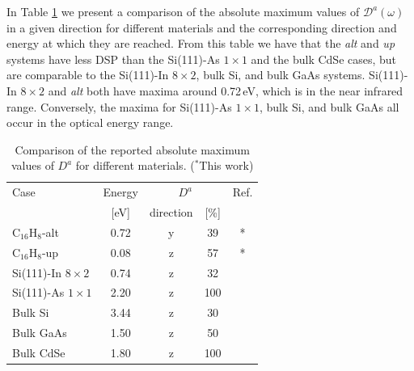 \documentclass[pss]{wiley2sp} %
\begin{document}
In Table \ref{tab:dacomp} we present a comparison of the absolute maximum
values of $\mathcal{D}^{a}(\omega)$ in a given direction for different
materials and the corresponding direction and energy at which they are
reached. From this table we have that the \emph{alt} and \emph{up} systems
have less DSP than the Si(111)-As $1\times1$ and the bulk CdSe cases, but are
comparable to the Si(111)-In $8\times2$, bulk Si, and bulk GaAs systems.
Si(111)-In $8\times2$ and \emph{alt} both have maxima around 0.72\,eV, which
is in the near infrared range. Conversely, the maxima for Si(111)-As
$1\times1$, bulk Si, and bulk GaAs all occur in the optical energy range.
\begin{table}[b]
\centering
\sidecaption
\begin{tabular}{lcccc}
\hline
\hline
Case & Energy &  \multicolumn{2}{c}{$D^{a}$} &  Ref.\\
\cline{3-4}   & [eV]   & direction & [\%] \\
\hline
C$_{16}$H$_{8}$-alt    & 0.72 & y & 39  & * \\
C$_{16}$H$_{8}$-up     & 0.08 & z & 57  & * \\
Si(111)-In $8\times2$  & 0.74 & z & 32  & \cite{arzatePRB14}\\
Si(111)-As $1\times1$  & 2.20 & z & 100 & \cite{mendozaPRB12}\\
Bulk Si                & 3.44 & z & 30  & \cite{nastosPRB07}\\
Bulk GaAs              & 1.50 & z & 50  & \cite{nastosPRB07,bhatPRB05}\\
Bulk CdSe              & 1.80 & z & 100 & \cite{nastosPRB07}\\
\hline
\hline
\end{tabular}
\caption[]{Comparison of the reported absolute maximum values of {$D^{a}$} for
different materials. ($^{*}$This work)}
\label{tab:dacomp}
\end{table}
\end{document}
